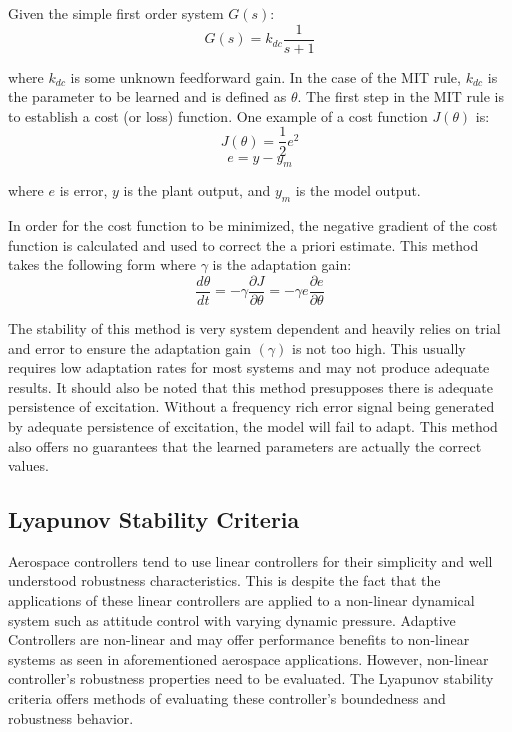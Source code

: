 Given the simple first order system $G(s)$:
\begin{equation}
G(s) = k_{dc}\frac{1}{s+1}
\end{equation}

where $k_{dc}$ is some unknown feedforward gain.  In the case of the MIT rule, $k_{dc}$ is the parameter to be learned and is defined as $\theta$.  The first step in the MIT rule is to establish a cost (or loss) function.  One example of a cost function $J(\theta)$ is:
\begin{equation}
J(\theta) = \frac{1}{2}e^2
\end{equation}
\begin{equation}
e=y-y_m
\end{equation}

where $e$ is error, $y$ is the plant output, and $y_m$ is the model output.

In order for the cost function to be minimized, the negative gradient of the cost function is calculated and used to correct the a priori estimate.  This method takes the following form where $\gamma$ is the adaptation gain:
\begin{equation}
\frac{d\theta}{dt}=-\gamma \frac{\partial{J}}{\partial{\theta}} =-\gamma e\frac{\partial{e}}{\partial{\theta}}
\end{equation}

The stability of this method is very system dependent and heavily relies on trial and error to ensure the adaptation gain $(\gamma)$ is not too high.  This usually requires low adaptation rates for most systems and may not produce adequate results.  It should also be noted that this method presupposes there is adequate persistence of excitation.  Without a frequency rich error signal being generated by adequate persistence of excitation, the model will fail to adapt.  This method also offers no guarantees that the learned parameters are actually the correct values.

\subsection{Lyapunov Stability Criteria}

Aerospace controllers tend to use linear controllers for their simplicity and well understood robustness characteristics.  This is despite the fact that the applications of these linear controllers are applied to a non-linear dynamical system such as attitude control with varying dynamic pressure.  Adaptive Controllers are non-linear and may offer performance benefits to non-linear systems as seen in aforementioned aerospace applications.  However, non-linear controller's robustness properties need to be evaluated.  The Lyapunov stability criteria offers methods of evaluating these controller's boundedness and robustness behavior.

